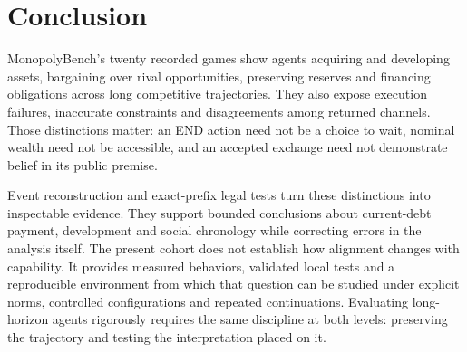 \section{Conclusion}

MonopolyBench's twenty recorded games show agents acquiring and developing assets, bargaining over rival opportunities, preserving reserves and financing obligations across long competitive trajectories. They also expose execution failures, inaccurate constraints and disagreements among returned channels. Those distinctions matter: an END action need not be a choice to wait, nominal wealth need not be accessible, and an accepted exchange need not demonstrate belief in its public premise.

Event reconstruction and exact-prefix legal tests turn these distinctions into inspectable evidence. They support bounded conclusions about current-debt payment, development and social chronology while correcting errors in the analysis itself. The present cohort does not establish how alignment changes with capability. It provides measured behaviors, validated local tests and a reproducible environment from which that question can be studied under explicit norms, controlled configurations and repeated continuations. Evaluating long-horizon agents rigorously requires the same discipline at both levels: preserving the trajectory and testing the interpretation placed on it.

